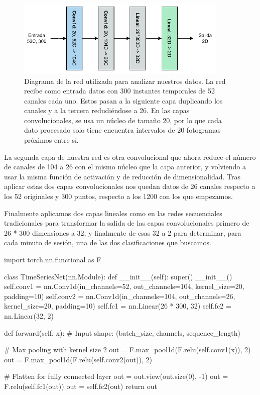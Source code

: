 \begin{figure}[h]
  \centering
  \includegraphics[width=0.9\textwidth]{figures/diagram-conv-lab.pdf}
  \caption[Diagrama de la red utilizada para analizar nuestros datos.]{Diagrama de la red utilizada para analizar nuestros datos. La red recibe como entrada datos con 300 instantes temporales de 52 canales cada uno. Estos pasan a la siguiente capa duplicando los canales y a la tercera redudiéndose a 26. En las capas convolucionales, se usa un núcleo de tamaño 20, por lo que cada dato procesado solo tiene encuentra intervalos de 20 fotogramas próximos entre sí.}
  \label{fig:diagram-conv-lab}
\end{figure}

La segunda capa de nuestra red es otra convolucional que ahora reduce el número de canales de 104 a 26 con el mismo núcleo que la capa anterior, y volviendo a usar la misma función de activación y de reducción de dimensionalidad. Tras aplicar estas dos capas convolucionales nos quedan datos de 26 canales respecto a los 52 originales y 300 puntos, respecto a los 1200 con los que empezamos.

Finalmente aplicamos dos capas lineales como en las redes secuenciales tradicionales para transformar la salida de las capas convolucionales primero de 26 * 300 dimensiones a 32, y finalmente de esas 32 a 2 para determinar, para cada minuto de sesión, una de las dos clasificaciones que buscamos.

\begin{mypython}[float={h}, caption=Red convolucional, label={code:convolutional}]
import torch.nn.functional as F

class TimeSeriesNet(nn.Module):
  def __init__(self):
    super().__init__()
    self.conv1 = nn.Conv1d(in_channels=52, out_channels=104,
                           kernel_size=20, padding=10)
    self.conv2 = nn.Conv1d(in_channels=104, out_channels=26,
                           kernel_size=20, padding=10)
    self.fc1 = nn.Linear(26 * 300, 32)
    self.fc2 = nn.Linear(32, 2)

  def forward(self, x):
    # Input shape: (batch_size, channels, sequence_length)

    # Max pooling with kernel size 2
    out = F.max_pool1d(F.relu(self.conv1(x)), 2)  
    out = F.max_pool1d(F.relu(self.conv2(out)), 2)

    # Flatten for fully connected layer
    out = out.view(out.size(0), -1)  
    out = F.relu(self.fc1(out))
    out = self.fc2(out)
    return out
\end{mypython}

